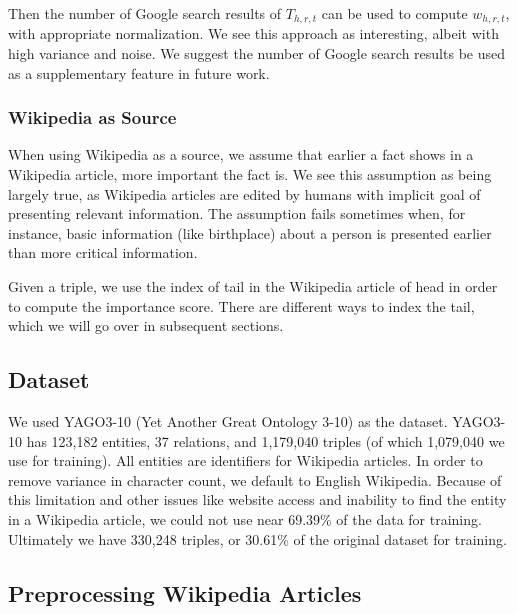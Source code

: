 \documentclass{article}
\begin{document}
Then the number of Google search results of $T_{h,r,t}$ can be used to compute $w_{h,r,t}$, with appropriate normalization. We see this approach as interesting, albeit with high variance and noise. We suggest the number of Google search results be used as a supplementary feature in future work.

\subsubsection{Wikipedia as Source}
When using Wikipedia as a source, we assume that earlier a fact shows in a Wikipedia article, more important the fact is. We see this assumption as being largely true, as Wikipedia articles are edited by humans with implicit goal of presenting relevant information. The assumption fails sometimes when, for instance, basic information (like birthplace) about a person is presented earlier than more critical information.

Given a triple, we use the index of tail in the Wikipedia article of head in order to compute the importance score. There are different ways to index the tail, which we will go over in subsequent sections.

\subsection{Dataset}

We used YAGO3-10 (Yet Another Great Ontology 3-10) as the dataset. YAGO3-10 has 123,182 entities, 37 relations, and 1,179,040 triples (of which 1,079,040 we use for training). All entities are identifiers for Wikipedia articles. In order to remove variance in character count, we default to English Wikipedia. Because of this limitation and other issues like website access and inability to find the entity in a Wikipedia article, we could not use near 69.39\% of the data for training. Ultimately we have 330,248 triples, or 30.61\% of the original dataset for training.

\subsection{Preprocessing Wikipedia Articles}
\end{document}
